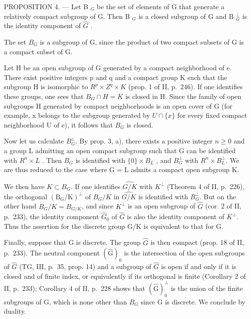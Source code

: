 PROPOSITION 4. --- Let B \(_{G}\) be the set of elements of G that generate a relatively compact subgroup of G. Then B \(_{G}\) is a closed subgroup of G and B \(_{G}^{\perp}\) is the identity component of \(\widehat{G}\) .

The set \(B_{G}\) is a subgroup of G, since the product of two compact subsets of G is a compact subset of G.

Let H be an open subgroup of G generated by a compact neighborhood of e. There exist positive integers p and q and a compact group K such that the subgroup H is isomorphic to \(R^{p} \times Z^{q} \times K\) (prop. 1 of II, p.~246). If one identifies these groups, one sees that \(B_{G} \cap H = K\) is closed in H. Since the family of open subgroups H generated by compact neighborhoods is an open cover of G (for example, x belongs to the subgroup generated by \(U \cap \{x\}\) for every fixed compact neighborhood U of e), it follows that \(B_{G}\) is closed.

Now let us calculate \(B_{G}^{\perp}\). By prop. 3, a), there exists a positive integer \(n \geqslant 0\) and a group L admitting an open compact subgroup such that G can be identified with \(R^{n} \times L\) . Then \(B_{G}\) is identified with \(\{0\} \times B_{L}\) , and \(B_{G}^{\perp}\) with \(R^{n} \times B_{L}^{\perp}\). We are thus reduced to the case where G = L admits a compact open subgroup K.

We then have \(K \subset B_{G}\). If one identifies \(\widehat{G/K}\) with \(K^{\perp}\) (Theorem 4 of II, p.~226), the orthogonal \((\mathrm{B}_{\mathrm{G}}/\mathrm{K})^{\perp}\) of \(B_{G}/K\) in \(\widehat{G/K}\) is identified with \(B_{G}^{\perp}\). But on the other hand \(B_{G}/K = B_{G/K}\), and since \(K^{\perp}\) is an open subgroup of \(\widehat{G}\) (cor. 2 of II, p.~233), the identity component \(\widehat{G}_{0}\) of \(\widehat{G}\) is also the identity component of \(K^{\perp}\). Thus the assertion for the discrete group G/K is equivalent to that for G.

Finally, suppose that G is discrete. The group \(\widehat{G}\) is then compact (prop. 18 of II, p.~233). The neutral component \((\widehat{\mathrm{G}})_{0}\) is the intersection of the open subgroups of \(\widehat{G}\) (TG, III, p.~35, prop. 14) and a subgroup of \(\widehat{G}\) is open if and only if it is closed and of finite index, or equivalently if its orthogonal is finite (Corollary 2 of II, p.~233); Corollary 4 of II, p.~228 shows that \((\widehat{\mathrm{G}})_{0}^{\perp}\) is the union of the finite subgroups of G, which is none other than \(B_{G}\) since G is discrete. We conclude by duality.

